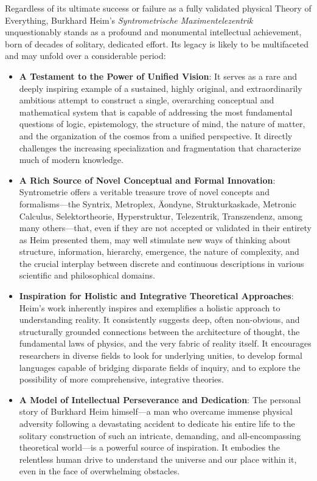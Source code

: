 \documentclass[
    12pt,              %
    a4paper,           %
    headings=normal,   %
    twoside=true,      %
    BCOR=8mm,          %
]{scrbook}
\begin{document}
Regardless of its ultimate success or failure as a fully validated physical Theory of Everything, Burkhard Heim’s \textit{Syntrometrische Maximentelezentrik} unquestionably stands as a profound and monumental intellectual achievement, born of decades of solitary, dedicated effort. Its legacy is likely to be multifaceted and may unfold over a considerable period:
\begin{itemize}
    \item \textbf{A Testament to the Power of Unified Vision}: It serves as a rare and deeply inspiring example of a sustained, highly original, and extraordinarily ambitious attempt to construct a single, overarching conceptual and mathematical system that is capable of addressing the most fundamental questions of logic, epistemology, the structure of mind, the nature of matter, and the organization of the cosmos from a unified perspective. It directly challenges the increasing specialization and fragmentation that characterize much of modern knowledge.
    \item \textbf{A Rich Source of Novel Conceptual and Formal Innovation}: Syntrometrie offers a veritable treasure trove of novel concepts and formalisms—the Syntrix, Metroplex, Äondyne, Strukturkaskade, Metronic Calculus, Selektortheorie, Hyperstruktur, Telezentrik, Transzendenz, among many others—that, even if they are not accepted or validated in their entirety as Heim presented them, may well stimulate new ways of thinking about structure, information, hierarchy, emergence, the nature of complexity, and the crucial interplay between discrete and continuous descriptions in various scientific and philosophical domains.
    \item \textbf{Inspiration for Holistic and Integrative Theoretical Approaches}: Heim's work inherently inspires and exemplifies a holistic approach to understanding reality. It consistently suggests deep, often non-obvious, and structurally grounded connections between the architecture of thought, the fundamental laws of physics, and the very fabric of reality itself. It encourages researchers in diverse fields to look for underlying unities, to develop formal languages capable of bridging disparate fields of inquiry, and to explore the possibility of more comprehensive, integrative theories.
    \item \textbf{A Model of Intellectual Perseverance and Dedication}: The personal story of Burkhard Heim himself—a man who overcame immense physical adversity following a devastating accident to dedicate his entire life to the solitary construction of such an intricate, demanding, and all-encompassing theoretical world—is a powerful source of inspiration. It embodies the relentless human drive to understand the universe and our place within it, even in the face of overwhelming obstacles.
\end{itemize}
\end{document}
